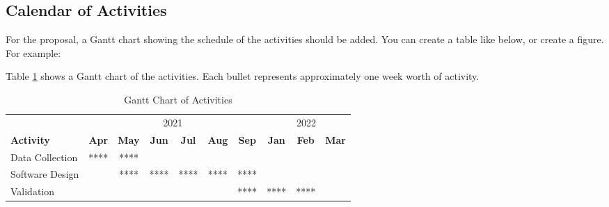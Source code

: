 \subsection{Calendar of Activities}

For the proposal, a Gantt chart showing the schedule of the activities should be added. You can create a table like below, or create a figure. For example:

Table \ref{tab:timetableactivities} shows a Gantt chart of the activities.  Each bullet represents approximately one week worth of activity.

\begin{table}[]
    \centering
    \begin{tabular}{l|c|c|c|c|c|c|c|c|c}
         \toprule
         & \multicolumn{6}{c|}{2021} & \multicolumn{3}{c}{2022} \\
         \textbf{Activity} & \textbf{Apr} & \textbf{May} & \textbf{Jun} & \textbf{Jul} & \textbf{Aug} & \textbf{Sep} & \textbf{Jan} & \textbf{Feb} & \textbf{Mar} \\
         \midrule
         Data Collection & **** & **** & & & & & & & \\
         \midrule
         Software Design & & **** & **** & **** & **** & **** & & & \\
         \midrule
         Validation & & & & & & **** & **** & **** & \\
         \bottomrule
    \end{tabular}
    \caption{Gantt Chart of Activities}
    \label{tab:timetableactivities}
\end{table}